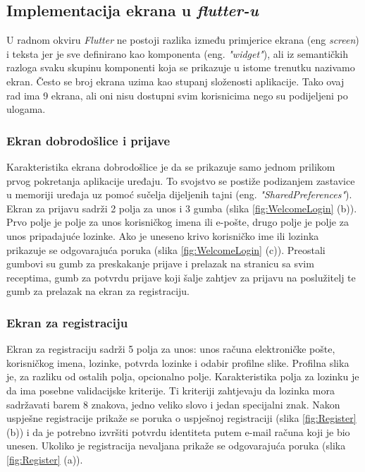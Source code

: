 \documentclass[times, utf8, zavrsni]{fer}
\begin{document}
\subsection{Implementacija ekrana u \textit{flutter-u}}
U radnom okviru \textit{Flutter} ne postoji razlika između primjerice ekrana (eng \textit{screen}) i teksta jer je sve definirano
kao komponenta (eng. \textit{"widget"}), ali iz semantičkih razloga svaku skupinu komponenti koja
se prikazuje u istome trenutku nazivamo ekran. Često se broj ekrana uzima kao stupanj
složenosti aplikacije. Tako ovaj rad ima 9 ekrana, ali oni nisu dostupni svim korisnicima nego
su podijeljeni po ulogama.

\subsubsection{Ekran dobrodošlice i prijave}
Karakteristika ekrana dobrodošlice je
da se prikazuje samo jednom prilikom prvog pokretanja aplikacije
uređaju. To svojstvo se postiže podizanjem zastavice u memoriji uređaja uz pomoć
sučelja dijeljenih tajni (eng. \textit{"SharedPreferences"}).
Ekran za prijavu sadrži 2 polja za unos i 3 gumba (slika \ref{fig:WelcomeLogin} (b)). Prvo polje je polje za unos
korisničkog imena ili e-pošte, drugo polje je polje za unos pripadajuće lozinke. Ako je uneseno
krivo korisničko ime ili lozinka prikazuje se odgovarajuća poruka (slika \ref{fig:WelcomeLogin} (c)). Preostali gumbovi su
gumb za preskakanje prijave i prelazak na stranicu sa svim receptima, gumb
za potvrdu prijave koji šalje zahtjev za prijavu na poslužitelj te gumb za prelazak na ekran za registraciju.

\subsubsection{Ekran za registraciju}
Ekran za registraciju sadrži 5 polja za unos: unos računa elektroničke pošte,
korisničkog imena, lozinke, potvrda lozinke i odabir profilne slike. Profilna slika je, za
razliku od ostalih polja, opcionalno polje. Karakteristika polja za lozinku je da ima posebne
validacijske kriterije. Ti kriteriji zahtjevaju da lozinka mora
sadržavati barem 8 znakova, jedno veliko slovo i jedan specijalni znak.
Nakon uspješne registracije
prikaže se poruka o uspješnoj registraciji (slika \ref{fig:Register} (b)) i da je potrebno izvršiti potvrdu identiteta
putem e-mail računa koji je bio unesen. Ukoliko je registracija nevaljana prikaže se odgovarajuća poruka (slika \ref{fig:Register} (a)).
\end{document}
